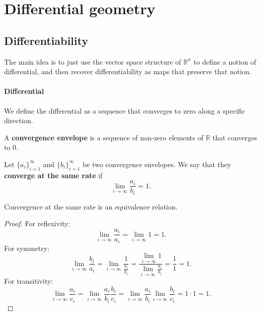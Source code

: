 \chapter{Differential geometry}

\section{Differentiability}

The main idea is to just use the vector space structure of $\mathbb{R}^n$ to define a notion of differential, and then recover differentiability as maps that preserve that notion.

\subsubsection{Differential}

We define the differential as a sequence that converges to zero along a specific direction.

\begin{defn}
	A \textbf{convergence envelope} is a sequence of non-zero elements of $\mathbb{R}$ that converges to $0$.
\end{defn}

\iffalse

\begin{defn}
	Let $\{a_i\}_{i=1}^{\infty}$ and $\{b_i\}_{i=1}^{\infty}$ be two convergence envelopes. We say that they \textbf{converge at the same rate} if 
	$$ \lim\limits_{i \to \infty} \frac{a_i}{b_i} = 1.$$
\end{defn}

\begin{prop}
	Convergence at the same rate is an equivalence relation.
\end{prop}

\begin{proof}
	For reflexivity:
	$$ \lim\limits_{i \to \infty} \frac{a_i}{a_i} = \lim\limits_{i \to \infty} 1 = 1.$$
	For symmetry:
	$$ \lim\limits_{i \to \infty} \frac{b_i}{a_i} = \lim\limits_{i \to \infty} \frac{1}{\frac{a_i}{b_i}} = \frac{ \lim\limits_{i \to \infty} 1}{\lim\limits_{i \to \infty} \frac{a_i}{b_i}} = \frac{1}{1} = 1.$$
	For transitivity:
	$$ \lim\limits_{i \to \infty} \frac{a_i}{c_i} = \lim\limits_{i \to \infty} \frac{a_i}{b_i}\frac{b_i}{c_i} = \lim\limits_{i \to \infty} \frac{a_i}{b_i} \lim\limits_{i \to \infty} \frac{b_i}{c_i} = 1 \cdot 1 = 1.$$
\end{proof}

